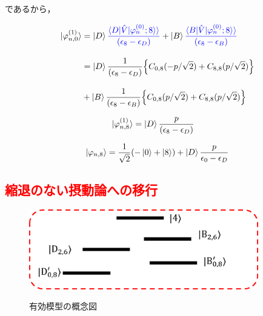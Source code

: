 であるから，

\begin{align}
    \ket{\varphi_{n,0}^{(1)}}
    &=
    \ket{D}
    \textcolor{blue}{
    \frac{\braket{D|\hat{V}|\varphi^{(0)}_n;8}\rangle}{(\epsilon_{8}-\epsilon_D)}}
    +
    \ket{B}
    \textcolor{blue}{
    \frac{\braket{B|\hat{V}|\varphi^{(0)}_n;8}\rangle}{(\epsilon_8-\epsilon_B)}}\\[10pt]
    &=\ket{D}
    \frac{1}{(\epsilon_{8}-\epsilon_D)}
    \Bigl\{C_{0,8}(-p/\sqrt{2}) + C_{8,8} (p/\sqrt{2})\Bigr\}\nn[10pt]
    &+
    \ket{B}
    \frac{1}{(\epsilon_{8}-\epsilon_B)}
    \Bigl\{C_{0,8}(p/\sqrt{2}) + C_{8,8} (p/\sqrt{2})\Bigr\}
\end{align}


\begin{align}
    \ket{\varphi_{n,8}^{(1)}}
    &=
    \ket{D}
    \frac{p}{(\epsilon_{8}-\epsilon_D)}
\end{align}


\begin{equation}
     \ket{\varphi_{n,8}}
     = \frac{1}{\sqrt{2}}(-\ket{0}+\ket{8}) + \ket{D}\frac{p}{\epsilon_0-\epsilon_{D}}
\end{equation}



\subsection{\textcolor{red}{縮退のない摂動論への移行}}
\begin{figure}[h]
\centering
		\includegraphics[width=10cm]{file/fig/effective_0and8/KPO_effective_0and8_5.png} \\
\caption{有効模型の概念図}
\label{fig:kpo_effective_0and8_5}
\end{figure}

